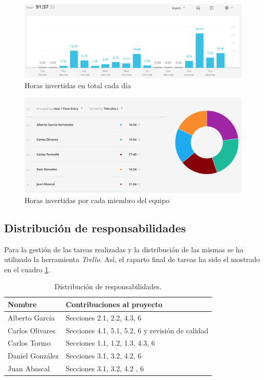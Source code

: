 \begin{figure}[H]
\begin{center}
\includegraphics[width=1\textwidth]{horasTotales}
\end{center}
\caption{Horas invertidas en total cada día}
\label{tab:horasTotales}
\end{figure}

\begin{figure}[H]
\begin{center}
\includegraphics[width=1\textwidth]{horasMiembro}
\end{center}
\caption{Horas invertidas por cada miembro del equipo}
\label{tab:horasMiembro}
\end{figure}

\subsection*{Distribución de responsabilidades}
\par Para la gestión de las tareas realizadas y la distribución de las mismas se ha utilizado la herramienta \textit{Trello}. Así, el raparto final de tareas ha sido el mostrado en el cuadro \ref{tabla:respDist}.

\begin{table}[H]
\begin{center}
\begin{tabular}{ l p{9cm} }
\textbf{Nombre}&\textbf{Contribuciones al proyecto}\\
\hline \hline
Alberto García & Secciones 2.1, 2.2, 4.3, 6 \\
\hline
Carlos Olivares & Secciones 4.1, 5.1, 5.2, 6 y revisión de calidad\\
\hline
Carlos Tormo & Secciones 1.1, 1.2, 1.3, 4.3, 6\\
\hline
Daniel González & Secciones 3.1, 3.2, 4.2, 6 \\
\hline
Juan Abascal & Secciones 3.1, 3.2, 4.2 , 6\\
\hline
\end{tabular}
\caption{Distribución de responsabilidades.}
\label{tabla:respDist}
\end{center}
\end{table}
